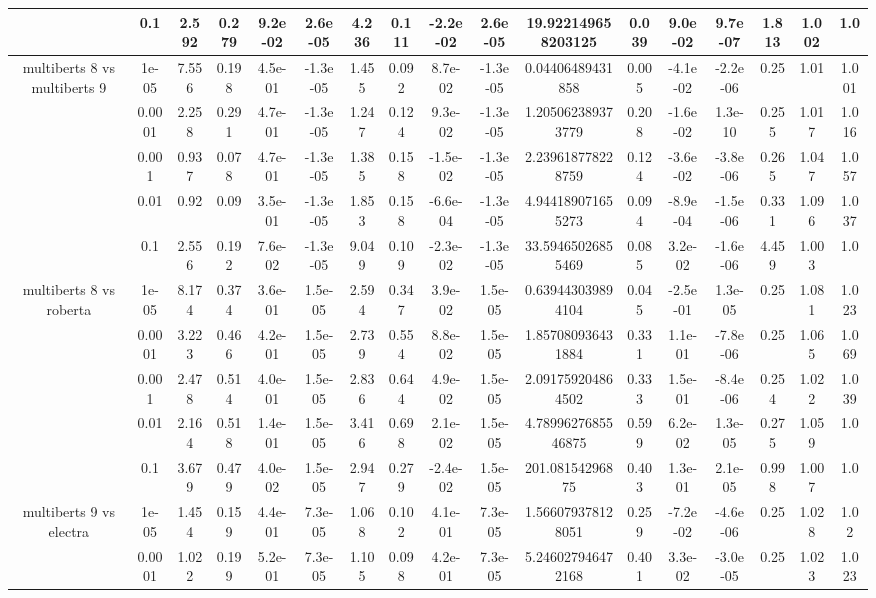 \begin{tabular}{|c|c|c|c|c|c|c|c|c|c|c|c|c|c|c|c|c|}
 & 0.1 & 2.592 & 0.279 & 9.2e-02 & 2.6e-05 & 4.236 & 0.111 & -2.2e-02 & 2.6e-05 & 19.922149658203125 & 0.039 & 9.0e-02 & 9.7e-07 & 1.813 & 1.002 & 1.0 \\
\hline
\multirow{5}{*}{multiberts 8 vs multiberts 9} & 1e-05 & 7.556 & 0.198 & 4.5e-01 & -1.3e-05 & 1.455 & 0.092 & 8.7e-02 & -1.3e-05 & 0.04406489431858 & 0.005 & -4.1e-02 & -2.2e-06 & 0.25 & 1.01 & 1.001 \\
 & 0.0001 & 2.258 & 0.291 & 4.7e-01 & -1.3e-05 & 1.247 & 0.124 & 9.3e-02 & -1.3e-05 & 1.205062389373779 & 0.208 & -1.6e-02 & 1.3e-10 & 0.255 & 1.017 & 1.016 \\
 & 0.001 & 0.937 & 0.078 & 4.7e-01 & -1.3e-05 & 1.385 & 0.158 & -1.5e-02 & -1.3e-05 & 2.239618778228759 & 0.124 & -3.6e-02 & -3.8e-06 & 0.265 & 1.047 & 1.057 \\
 & 0.01 & 0.92 & 0.09 & 3.5e-01 & -1.3e-05 & 1.853 & 0.158 & -6.6e-04 & -1.3e-05 & 4.944189071655273 & 0.094 & -8.9e-04 & -1.5e-06 & 0.331 & 1.096 & 1.037 \\
 & 0.1 & 2.556 & 0.192 & 7.6e-02 & -1.3e-05 & 9.049 & 0.109 & -2.3e-02 & -1.3e-05 & 33.59465026855469 & 0.085 & 3.2e-02 & -1.6e-06 & 4.459 & 1.003 & 1.0 \\
\hline
\multirow{5}{*}{multiberts 8 vs roberta } & 1e-05 & 8.174 & 0.374 & 3.6e-01 & 1.5e-05 & 2.594 & 0.347 & 3.9e-02 & 1.5e-05 & 0.639443039894104 & 0.045 & -2.5e-01 & 1.3e-05 & 0.25 & 1.081 & 1.023 \\
 & 0.0001 & 3.223 & 0.466 & 4.2e-01 & 1.5e-05 & 2.739 & 0.554 & 8.8e-02 & 1.5e-05 & 1.857080936431884 & 0.331 & 1.1e-01 & -7.8e-06 & 0.25 & 1.065 & 1.069 \\
 & 0.001 & 2.478 & 0.514 & 4.0e-01 & 1.5e-05 & 2.836 & 0.644 & 4.9e-02 & 1.5e-05 & 2.091759204864502 & 0.333 & 1.5e-01 & -8.4e-06 & 0.254 & 1.022 & 1.039 \\
 & 0.01 & 2.164 & 0.518 & 1.4e-01 & 1.5e-05 & 3.416 & 0.698 & 2.1e-02 & 1.5e-05 & 4.7899627685546875 & 0.599 & 6.2e-02 & 1.3e-05 & 0.275 & 1.059 & 1.0 \\
 & 0.1 & 3.679 & 0.479 & 4.0e-02 & 1.5e-05 & 2.947 & 0.279 & -2.4e-02 & 1.5e-05 & 201.08154296875 & 0.403 & 1.3e-01 & 2.1e-05 & 0.998 & 1.007 & 1.0 \\
\hline
\multirow{5}{*}{multiberts 9 vs electra } & 1e-05 & 1.454 & 0.159 & 4.4e-01 & 7.3e-05 & 1.068 & 0.102 & 4.1e-01 & 7.3e-05 & 1.566079378128051 & 0.259 & -7.2e-02 & -4.6e-06 & 0.25 & 1.028 & 1.02 \\
 & 0.0001 & 1.022 & 0.199 & 5.2e-01 & 7.3e-05 & 1.105 & 0.098 & 4.2e-01 & 7.3e-05 & 5.246027946472168 & 0.401 & 3.3e-02 & -3.0e-05 & 0.25 & 1.023 & 1.023 \\

\end{tabular}
